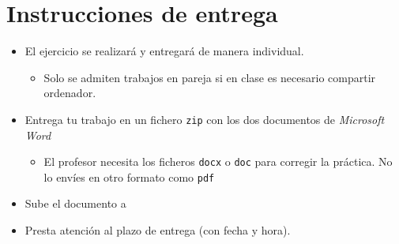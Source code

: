 \section{Instrucciones de entrega}
\begin{itemize}
\item El ejercicio se realizará y entregará de manera individual.
  \begin{itemize}
  \item Solo se admiten trabajos en pareja si en clase es necesario compartir ordenador.
  \end{itemize}
\item Entrega tu trabajo en un fichero \texttt{zip} con los dos documentos de \textit{Microsoft Word}
  \begin{itemize}
  \item El profesor necesita los ficheros \texttt{docx} o \texttt{doc} para corregir la práctica. No lo envíes en otro formato como \texttt{pdf}
  \end{itemize}

\item Sube el documento a 
\item Presta atención al plazo de entrega (con fecha y hora).
  
\end{itemize}





